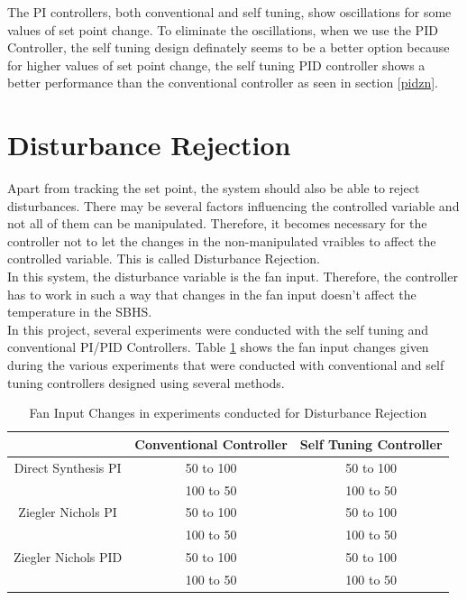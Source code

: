 The PI controllers, both conventional and self tuning, show oscillations for some values of set point change. To eliminate the oscillations, when we use the PID Controller, the self tuning design definately seems to be a better option because for higher values of set point change, the self tuning PID controller shows a better performance than the conventional controller as seen in section \ref{pidzn}.

\section{Disturbance Rejection}

Apart from tracking the set point, the system should also be able to reject disturbances. There may be several factors influencing the controlled variable and not all of them can be manipulated. Therefore, it becomes necessary for the controller not to let the changes in the non-manipulated vraibles to affect the controlled variable. This is called Disturbance Rejection.\\

In this system, the disturbance variable is the fan input. Therefore, the controller has to work in such a way that changes in the fan input doesn't affect the temperature in the SBHS.\\

In this project, several experiments were conducted with the self tuning and conventional PI/PID Controllers. Table \ref{dist} shows the fan input changes given during the various experiments that were conducted with conventional and self tuning controllers designed using several methods.\\
\begin{table}[h]
	\centering
		\begin{tabular}{||c|c|c|}\hline
			&Conventional Controller&Self Tuning Controller\\\hline \hline
		Direct Synthesis PI&50 to 100&50 to 100\\
											 &100 to 50&100 to 50\\\hline
		Ziegler Nichols PI &50 to 100&50 to 100\\
												&100 to 50&100 to 50 \\\hline
		Ziegler Nichols PID&50 to 100&50 to 100\\
												&100 to 50&100 to 50\\\hline
		\end{tabular}
	\caption{Fan Input Changes in experiments conducted for Disturbance Rejection}
	\label{dist}
\end{table}


